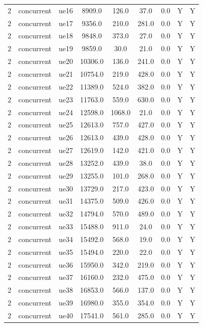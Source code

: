 \begin{table}[ht]
\begin{tabular}{|c|c|c|c|c|c|c|c|c|}
2 & concurrent & ue16 & 8909.0 & 126.0 & 37.0 & 0.0 & Y & Y \\
2 & concurrent & ue17 & 9356.0 & 210.0 & 281.0 & 0.0 & Y & Y \\
2 & concurrent & ue18 & 9848.0 & 373.0 & 27.0 & 0.0 & Y & Y \\
2 & concurrent & ue19 & 9859.0 & 30.0 & 21.0 & 0.0 & Y & Y \\
2 & concurrent & ue20 & 10306.0 & 136.0 & 241.0 & 0.0 & Y & Y \\
2 & concurrent & ue21 & 10754.0 & 219.0 & 428.0 & 0.0 & Y & Y \\
2 & concurrent & ue22 & 11389.0 & 524.0 & 382.0 & 0.0 & Y & Y \\
2 & concurrent & ue23 & 11763.0 & 559.0 & 630.0 & 0.0 & Y & Y \\
2 & concurrent & ue24 & 12598.0 & 1068.0 & 21.0 & 0.0 & Y & Y \\
2 & concurrent & ue25 & 12613.0 & 757.0 & 427.0 & 0.0 & Y & Y \\
2 & concurrent & ue26 & 12613.0 & 439.0 & 428.0 & 0.0 & Y & Y \\
2 & concurrent & ue27 & 12619.0 & 142.0 & 421.0 & 0.0 & Y & Y \\
2 & concurrent & ue28 & 13252.0 & 439.0 & 38.0 & 0.0 & Y & Y \\
2 & concurrent & ue29 & 13255.0 & 101.0 & 268.0 & 0.0 & Y & Y \\
2 & concurrent & ue30 & 13729.0 & 217.0 & 423.0 & 0.0 & Y & Y \\
2 & concurrent & ue31 & 14375.0 & 509.0 & 426.0 & 0.0 & Y & Y \\
2 & concurrent & ue32 & 14794.0 & 570.0 & 489.0 & 0.0 & Y & Y \\
2 & concurrent & ue33 & 15488.0 & 911.0 & 24.0 & 0.0 & Y & Y \\
2 & concurrent & ue34 & 15492.0 & 568.0 & 19.0 & 0.0 & Y & Y \\
2 & concurrent & ue35 & 15494.0 & 220.0 & 22.0 & 0.0 & Y & Y \\
2 & concurrent & ue36 & 15950.0 & 342.0 & 219.0 & 0.0 & Y & Y \\
2 & concurrent & ue37 & 16160.0 & 232.0 & 475.0 & 0.0 & Y & Y \\
2 & concurrent & ue38 & 16853.0 & 566.0 & 137.0 & 0.0 & Y & Y \\
2 & concurrent & ue39 & 16980.0 & 355.0 & 354.0 & 0.0 & Y & Y \\
2 & concurrent & ue40 & 17541.0 & 561.0 & 285.0 & 0.0 & Y & Y \\

\end{tabular}
\end{table}
